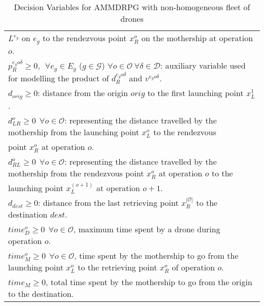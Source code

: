 \begin{table}[h!]
\begin{tabular}{|l|}
\hspace*{1cm} $L^{e_g}$ on $e_g$ to the rendezvous point $x_R^o$ on the mothership at operation $o$.\\
$p_R^{e_go\delta} \geq 0, \:\: \forall e_g \in E_g$ ($g \in \mathcal{G}$) $\forall o \in \mathcal O \:\forall \delta\in\mathcal D$: auxiliary variable used for modelling the product of $d_R^{e_go\delta}$ and $v^{e_go\delta}$.\\
$d_{orig}\geq 0$: distance from the origin $orig$ to the first launching point $x_L^1$.\\
$d_{LR}^o \geq 0 \:\: \forall o \in \mathcal O$: representing the distance travelled by the mothership from the launching point $x_L^o$ to the rendezvous\\
\hspace*{1cm}   point $x_R^o$ at operation $o$.\\
$d_{RL}^o \geq 0 \:\: \forall o \in \mathcal O$: representing the distance travelled by the mothership from the rendezvous point $x_R^o$ at operation $o$ to the \\ 
\hspace*{1cm}  launching point $x_L^{(o+1)}$ at operation $o+1$.\\
$d_{dest}\geq 0$: distance from the last retrieving point $x_R^{|\mathcal O|}$ to the destination $dest$.\\
$time_D^o \geq 0 \:\: \forall o \in \mathcal O$, maximum time spent by a drone during operation $o$.\\
$time_M^o \geq 0 \:\: \forall o \in \mathcal O$, time spent by the mothership to go from the launching point $x_L^o$ to the retrieving point $x_R^o$ of operation $o$.\\
$time_M \geq 0$, total time spent by the mothership to go from the origin to the destination.\\
\hline
\end{tabular}
\caption{Decision Variables for AMMDRPG with non-homogeneous fleet of drones}
\label{table:At2}
\end{table}

